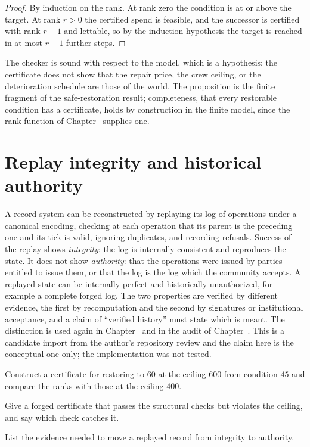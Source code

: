 \begin{proof}
By induction on the rank. At rank zero the condition is at or above the target. At rank $r>0$ the certified spend is feasible, and the successor is certified with rank $r-1$ and lettable, so by the induction hypothesis the target is reached in at most $r-1$ further steps.
\end{proof}

The checker is sound with respect to the model, which is a hypothesis: the certificate does not show that the repair price, the crew ceiling, or the deterioration schedule are those of the world. The proposition is the finite fragment of the safe-restoration result; completeness, that every restorable condition has a certificate, holds by construction in the finite model, since the rank function of Chapter~ supplies one.

\section{Replay integrity and historical authority}

A record system can be reconstructed by replaying its log of operations under a canonical encoding, checking at each operation that its parent is the preceding one and its tick is valid, ignoring duplicates, and recording refusals. Success of the replay shows \emph{integrity}: the log is internally consistent and reproduces the state. It does not show \emph{authority}: that the operations were issued by parties entitled to issue them, or that the log is the log which the community accepts. A replayed state can be internally perfect and historically unauthorized, for example a complete forged log. The two properties are verified by different evidence, the first by recomputation and the second by signatures or institutional acceptance, and a claim of ``verified history'' must state which is meant. The distinction is used again in Chapter~ and in the audit of Chapter~. This is a candidate import from the author's repository review and the claim here is the conceptual one only; the implementation was not tested.

\begin{exercise}Construct a certificate for restoring to $60$ at the ceiling $600$ from condition $45$ and compare the ranks with those at the ceiling $400$.\end{exercise}
\begin{exercise}Give a forged certificate that passes the structural checks but violates the ceiling, and say which check catches it.\end{exercise}
\begin{exercise}List the evidence needed to move a replayed record from integrity to authority.\end{exercise}

